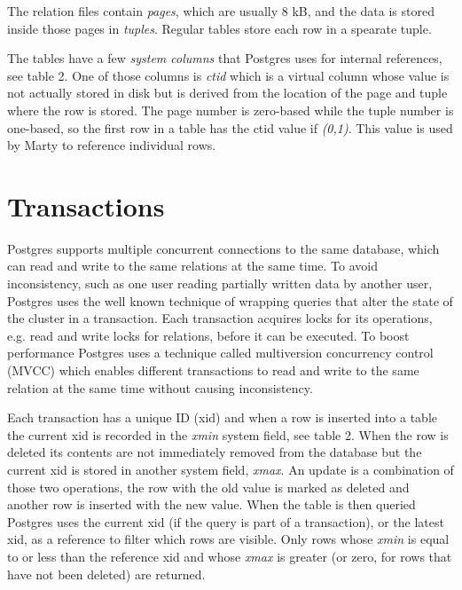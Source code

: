 \documentclass[a4paper,12pt,twoside,BCOR=10mm]{scrbook}
\begin{document}

The relation files contain \textit{pages}, which are usually 8 kB, and the data is stored inside those pages in \textit{tuples}. Regular tables store each row in a spearate tuple.


The tables have a few \textit{system columns} that Postgres uses for internal references, see table 2. One of those columns is \textit{ctid} which is a virtual column whose value is not actually stored in disk but is derived from the location of the page and tuple where the row is stored. The page number is zero-based while the tuple number is one-based, so the first row in a table has the ctid value if \textit{(0,1)}. This value is used by Marty to reference individual rows.


\section{Transactions}
Postgres supports multiple concurrent connections to the same database, which can read and write to the same relations at the same time. To avoid inconsistency, such as one user reading partially written data by another user, Postgres uses the well known technique of wrapping queries that alter the state of the cluster in a transaction. Each transaction acquires locks for its operations, e.g. read and write locks for relations, before it can be executed. To boost performance Postgres uses a technique called multiversion concurrency control (MVCC) which enables different transactions to read and write to the same relation at the same time without causing inconsistency.

Each transaction has a unique ID (xid) and when a row is inserted into a table the current xid is recorded in the \textit{xmin} system field, see table 2. When the row is deleted its contents are not immediately removed from the database but the current xid is stored in another system field, \textit{xmax}. An update is a combination of those two operations, the row with the old value is marked as deleted and another row is inserted with the new value. When the table is then queried Postgres uses the current xid (if the query is part of a transaction), or the latest xid, as a reference to filter which rows are visible. Only rows whose \textit{xmin} is equal to or less than the reference xid and whose \textit{xmax} is greater (or zero, for rows that have not been deleted) are returned.
\end{document}
